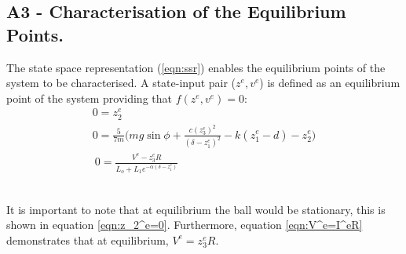 \documentclass[a4paper,10pt,reqno]{amsart}
\numberwithin{equation}{section}
\begin{document}
\subsection{A3 - Characterisation of the Equilibrium Points.}\label{sec:A3} 

\par The state space representation (\ref{eqn:ssr}) enables the equilibrium points of the system to be characterised. A state-input pair ($z^e, v^e$) is defined as an equilibrium point of the system providing that $f(z^e,v^e)=0$:
\begin{subequations}\label{eqn:Charaterised EQ}
\begin{gather}
    0=z_2^e \label{eqn:z_2^e=0}
    \\
    0=\frac{5}{7m}\bigg(mg\sin{\phi}+\frac{c(z_3^e)^2}{(\delta-z_1^e)^2}-k(z_1^e-d)-z_2^e\bigg)
    \\\
    0=\frac{V^e-z_3^eR}{L_o+L_1e^{-\alpha(\delta-z_1^e)}}\label{eqn:V^e=I^eR}
\end{gather}
\end{subequations}
\\
\par It is important to note that at equilibrium the ball would be stationary, this is shown in equation \ref{eqn:z_2^e=0}. Furthermore, equation \ref{eqn:V^e=I^eR} demonstrates that at equilibrium, $V^e=z_3^eR$.
\end{document}
